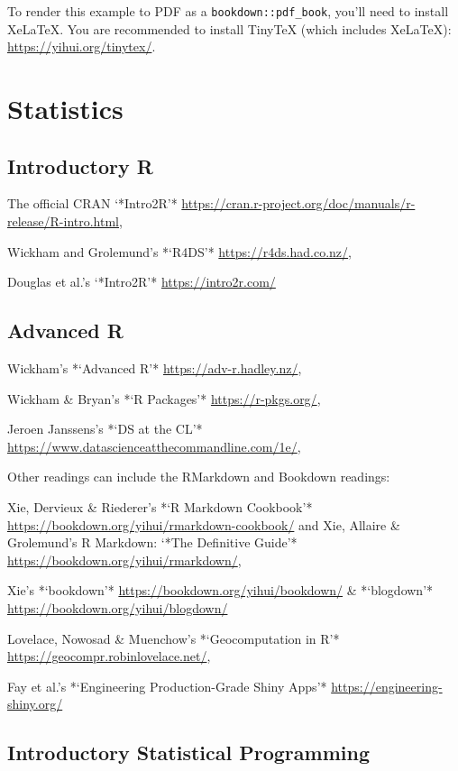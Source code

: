 \documentclass[
]{book}
\begin{document}
To render this example to PDF as a \texttt{bookdown::pdf\_book}, you'll need to install XeLaTeX. You are recommended to install TinyTeX (which includes XeLaTeX): \url{https://yihui.org/tinytex/}.

\chapter{Statistics}\label{statistics}

\section{Introductory R}\label{introductory-r}

The official CRAN `*Intro2R'* \url{https://cran.r-project.org/doc/manuals/r-release/R-intro.html},

Wickham and Grolemund's *`R4DS'* \url{https://r4ds.had.co.nz/},

Douglas et al.'s `*Intro2R'* \url{https://intro2r.com/}

\section{Advanced R}\label{advanced-r}

Wickham's *`Advanced R'* \url{https://adv-r.hadley.nz/},

Wickham \& Bryan's *`R Packages'* \url{https://r-pkgs.org/},

Jeroen Janssens's *`DS at the CL'* \url{https://www.datascienceatthecommandline.com/1e/},

Other readings can include the RMarkdown and Bookdown readings:

Xie, Dervieux \& Riederer's *`R Markdown Cookbook'* \url{https://bookdown.org/yihui/rmarkdown-cookbook/} and Xie, Allaire \& Grolemund's R Markdown: `*The Definitive Guide'* \url{https://bookdown.org/yihui/rmarkdown/},

Xie's *`bookdown'* \url{https://bookdown.org/yihui/bookdown/} \& *`blogdown'* \url{https://bookdown.org/yihui/blogdown/}

Lovelace, Nowosad \& Muenchow's *`Geocomputation in R'* \url{https://geocompr.robinlovelace.net/},

Fay et al.'s *`Engineering Production-Grade Shiny Apps'* \url{https://engineering-shiny.org/}

\section{Introductory Statistical Programming}\label{introductory-statistical-programming}
\end{document}

